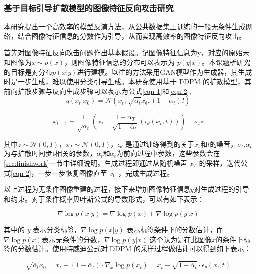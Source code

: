 \subsubsection{基于目标引导扩散模型的图像特征反向攻击研究}\label{sec:plan_1}
本研究提出一个高效率的模型反演方法，从公共数据集上训练的一般无条件生成网络，结合图像特征信息的分数作为引导，从而实现高效率的图像特征反向攻击。
\par
首先对图像特征反向攻击问题作出基本假设。记图像特征信息为y，对应的原始未知图像为$x \sim p(x)$，则图像特征信息的分布可以表示为 $p(y|x)$。本课题所研究的目标是对分布$p(x|y)$进行建模。以往的方法采用GAN模型作为生成器，其生成时是一步生成，难以使用分类引导生成。本研究使用基于 DDPM 的扩散模型，其前向扩散步骤与反向生成步骤可以表示为公式\eqref{eqn-1}和\eqref{eqn-2},
\begin{equation}\label{eqn-1}
      q(x_t|x_{0})=\mathcal{N}(x_t;\sqrt{\overline{\alpha}_t}x_{0},(1-\overline{\alpha}_t)I)
\end{equation}

\begin{equation}\label{eqn-2}
      x_{t-1}= \frac{1}{\sqrt{\alpha_t}}
      (x_t -
      \frac{1-\alpha_T}{\sqrt{1-\overline{\alpha}_t}}
      (\epsilon_\theta(x_t,t))) + \sigma_t z
\end{equation}

其中$z \sim \mathcal{N}(0,I)$，$x_T \sim \mathcal{N}(0,I)$，$\epsilon_\theta$ 是通过训练得到的关于$x_t$和$t$的噪音，$\sigma_t$,$\alpha_t$ 为与扩散时间步t相关的参数，$\alpha_t$和$\overline{\alpha}_t$为前向过程中参数，这些参数会在\ref{sec:finishwork}一节中详细说明。生成过程即通过从随机噪声 $x_T$ 的采样，迭代公式\eqref{eqn-2}，一步一步恢复图像直至 $x_0$ ，完成生成过程。
\par
以上过程为无条件图像重建的过程，接下来增加图像特征信息$y$对生成过程的引导和约束。对于条件概率贝叶斯公式的导数形式，可以有如下表示：

\begin{equation}\label{eqn-3}
      \nabla \log p(x|y) = \nabla \log p(x) + \nabla \log p(y|x)
\end{equation}

其中的 $y$ 表示分类标签，$\nabla \log p(x|y)$ 表示标签条件下的分数估计，而 $\nabla \log p(x)$表示无条件的分数，$\nabla \log p(y|x)$ 这个认为是在此图像$x$的条件下标签的分数估计。使用特威迪公式对 DDPM 的采样过程做估计可以得到如下表示：

\begin{equation}\label{eqn-4}
      \sqrt{\overline{\alpha}_t}x_0 = x_t + (1 - \overline{\alpha}_t) \cdot \nabla_x \log p(x_t) = x_t - \sqrt{1-\overline{\alpha}_t}\cdot\epsilon_\theta(x_t,t)
\end{equation}

